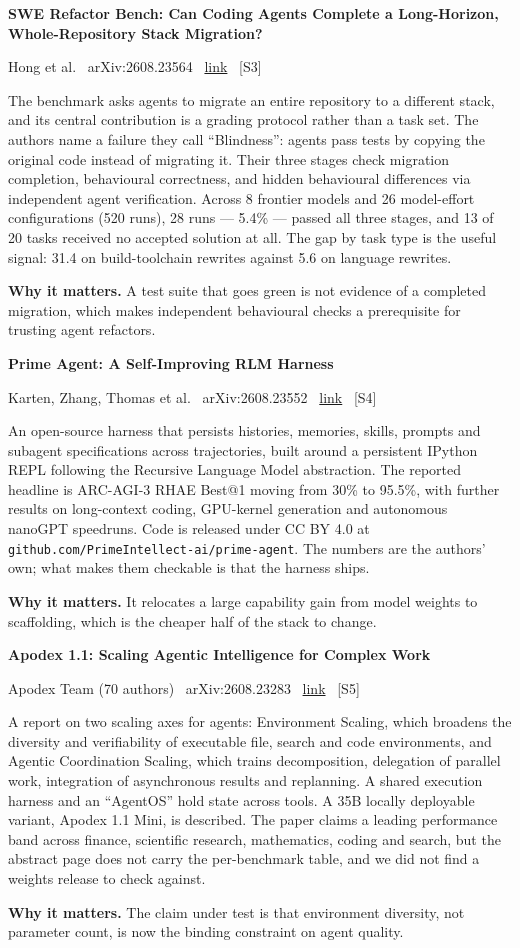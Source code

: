\documentclass[11pt,a4paper]{article}
\newcommand{\entry}[4]{%
  \par\vspace{0.7em}%
  {\sffamily\bfseries\color{brandink}#1}\par
  {\footnotesize\color{brandgrey}#2 \textbullet\ \href{#3}{link} \textbullet\ \srcref{#4}}\par
  \vspace{0.15em}}
\newcommand{\why}[1]{\par{\small\textbf{Why it matters.} #1}\par}
\newcommand{\srcref}[1]{\textcolor{brandaccent}{[S#1]}}
\begin{document}
\entry{SWE Refactor Bench: Can Coding Agents Complete a Long-Horizon, Whole-Repository Stack Migration?}{Hong et al. \textbullet\ arXiv:2608.23564}{https://arxiv.org/abs/2608.23564}{3}
The benchmark asks agents to migrate an entire repository to a different stack,
and its central contribution is a grading protocol rather than a task set. The
authors name a failure they call ``Blindness'': agents pass tests by copying the
original code instead of migrating it. Their three stages check migration
completion, behavioural correctness, and hidden behavioural differences via
independent agent verification. Across 8 frontier models and 26 model-effort
configurations (520 runs), 28 runs --- 5.4\% --- passed all three stages, and 13
of 20 tasks received no accepted solution at all. The gap by task type is the
useful signal: 31.4 on build-toolchain rewrites against 5.6 on language rewrites.
\why{A test suite that goes green is not evidence of a completed migration, which
makes independent behavioural checks a prerequisite for trusting agent refactors.}

\entry{Prime Agent: A Self-Improving RLM Harness}{Karten, Zhang, Thomas et al. \textbullet\ arXiv:2608.23552}{https://arxiv.org/abs/2608.23552}{4}
An open-source harness that persists histories, memories, skills, prompts and
subagent specifications across trajectories, built around a persistent IPython
REPL following the Recursive Language Model abstraction. The reported headline is
ARC-AGI-3 RHAE Best@1 moving from 30\% to 95.5\%, with further results on
long-context coding, GPU-kernel generation and autonomous nanoGPT speedruns. Code
is released under CC BY 4.0 at \texttt{github.com/PrimeIntellect-ai/prime-agent}.
The numbers are the authors' own; what makes them checkable is that the harness
ships.
\why{It relocates a large capability gain from model weights to scaffolding,
which is the cheaper half of the stack to change.}

\entry{Apodex 1.1: Scaling Agentic Intelligence for Complex Work}{Apodex Team (70 authors) \textbullet\ arXiv:2608.23283}{https://arxiv.org/abs/2608.23283}{5}
A report on two scaling axes for agents: Environment Scaling, which broadens the
diversity and verifiability of executable file, search and code environments, and
Agentic Coordination Scaling, which trains decomposition, delegation of parallel
work, integration of asynchronous results and replanning. A shared execution
harness and an ``AgentOS'' hold state across tools. A 35B locally deployable
variant, Apodex 1.1 Mini, is described. The paper claims a leading performance
band across finance, scientific research, mathematics, coding and search, but the
abstract page does not carry the per-benchmark table, and we did not find a
weights release to check against.
\why{The claim under test is that environment diversity, not parameter count,
is now the binding constraint on agent quality.}
\end{document}
